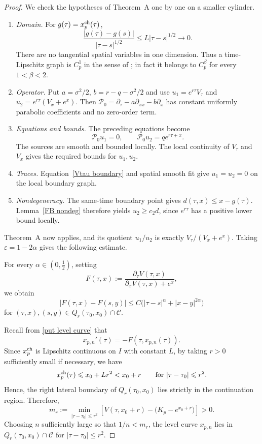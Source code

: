\documentclass[11pt, a4paper, leqno]{amsart}
\numberwithin{equation}{section}
\theoremstyle{plain}
\theoremstyle{definition}
\theoremstyle{remark}
\def\leq{\leqslant}
\def\geq{\geqslant}
\begin{document}
{\begin{proof}
{
We check the hypotheses of Theorem~A one by one on a smaller cylinder.
\begin{enumerate}[label=(\roman*)]
\item \emph{Domain.} For $g(\tau)=x_p^{\rm ch}(\tau)$,
\[
 \frac{|g(\tau)-g(s)|}{|\tau-s|^{1/2}}
 \leq L|\tau-s|^{1/2}\longrightarrow0.
\]
There are no tangential spatial variables in one dimension. Thus a
time-Lipschitz graph is $C_p^1$ in the sense of
\cite[Definition~1.1]{Kukuljan2022}; in fact it belongs to
$C_p^\beta$ for every $1<\beta<2$.
\item \emph{Operator.} Put $a=\sigma^2/2$,
$b=r-q-\sigma^2/2$ and use
$u_1=e^{r\tau}V_\tau$ and
$u_2=e^{r\tau}(V_x+e^x)$. Then
$\mathcal P_0=\partial_\tau-a\partial_{xx}-b\partial_x$
has constant uniformly parabolic coefficients and no zero-order term.
\item \emph{Equations and bounds.} The preceding equations become
\[
 \mathcal P_0u_1=0,\qquad
 \mathcal P_0u_2=q e^{r\tau+x}.
\]
The sources are smooth and bounded locally. The local continuity of
$V_\tau$ and $V_x$ gives the required bounds for $u_1,u_2$.
\item \emph{Traces.} Equation~\eqref{Vtau boundary} and spatial
smooth fit give $u_1=u_2=0$ on the local boundary graph.
\item \emph{Nondegeneracy.} The same-time boundary point gives
$d(\tau,x)\leq x-g(\tau)$. Lemma~\ref{FB nondeg} therefore yields
$u_2\geq c_2d$, since $e^{r\tau}$ has a positive lower bound locally.
\end{enumerate}
Theorem~A now applies, and its quotient $u_1/u_2$ is exactly
$V_\tau/(V_x+e^x)$. Taking $\varepsilon=1-2\alpha$ gives the
following estimate.
}
For every $\alpha\in(0,\frac12)$, setting
\[
    F(\tau,x)
    :=
    \frac{\partial_\tau V(\tau,x)}
    {\partial_xV(\tau,x)+e^x},
\]
we obtain
\[
    |F(\tau,x)-F(s,y)|
    \leq
    C\bigl(|\tau-s|^\alpha+|x-y|^{2\alpha}\bigr)
\]
for $(\tau,x),(s,y)\in Q_r(\tau_0,x_0)\cap\mathcal C$.

Recall from \eqref{put level curve} that
\[
    x_{p,n}'(\tau)
    =
    -F(\tau,x_{p,n}(\tau)).
\]
Since $x_p^{\rm ch}$ is Lipschitz continuous on $I$ with constant $L$,
by taking $r>0$ sufficiently small if necessary, we have
\[
    x_p^{\rm ch}(\tau)
    \leq x_0+Lr^2
    <x_0+r
    \qquad\text{for }|\tau-\tau_0|\leq r^2.
\]
Hence, the right lateral boundary of
$Q_r(\tau_0,x_0)$ lies strictly in the continuation region. Therefore,
\[
    m_r:=
    \min_{|\tau-\tau_0|\leq r^2}
    \left[
        V(\tau,x_0+r)-\bigl(K_p-e^{x_0+r}\bigr)
    \right]>0.
\]
Choosing $n$ sufficiently large so that $1/n<m_r$, the level curve
$x_{p,n}$ lies in $Q_r(\tau_0,x_0)\cap\mathcal C$ for
$|\tau-\tau_0|\leq r^2$.


\end{proof}}
\end{document}
